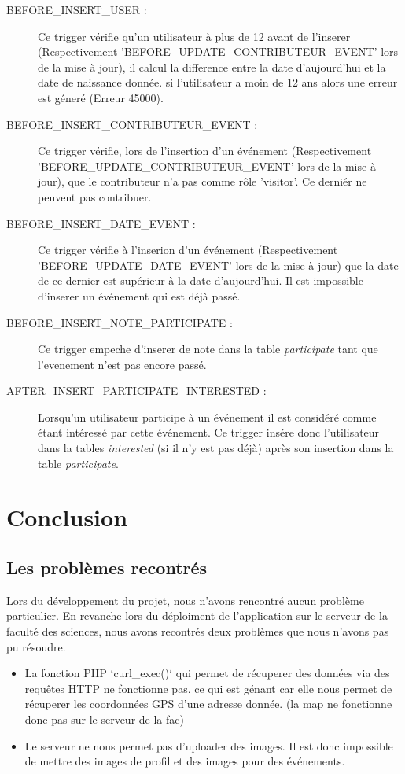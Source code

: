 \documentclass[oneside,11pt,a4paper]{article}
\begin{document}
\begin{description}
	\item[BEFORE\_INSERT\_USER : ] Ce trigger vérifie qu'un utilisateur à plus de 12 avant de l'inserer (Respectivement 'BEFORE\_UPDATE\_CONTRIBUTEUR\_EVENT' lors de la mise à jour), il calcul la difference entre la date d'aujourd'hui et la date de naissance donnée. si l'utilisateur a moin de 12 ans alors une erreur est géneré (Erreur 45000).
	\item[BEFORE\_INSERT\_CONTRIBUTEUR\_EVENT : ] Ce trigger vérifie, lors de l'insertion d'un événement (Respectivement 'BEFORE\_UPDATE\_CONTRIBUTEUR\_EVENT' lors de la mise à jour), que le contributeur n'a pas comme rôle 'visitor'. Ce derniér ne peuvent pas contribuer.
	\item[BEFORE\_INSERT\_DATE\_EVENT : ] Ce trigger vérifie à l'inserion d'un événement (Respectivement 'BEFORE\_UPDATE\_DATE\_EVENT' lors de la mise à jour) que la date de ce dernier est supérieur à la date d'aujourd'hui. Il est impossible d'inserer un événement qui est déjà passé.
	\item[BEFORE\_INSERT\_NOTE\_PARTICIPATE : ] Ce trigger empeche d'inserer de note dans la table \textit{participate} tant que l'evenement n'est pas encore passé.
	\item[AFTER\_INSERT\_PARTICIPATE\_INTERESTED : ] Lorsqu'un utilisateur participe à un événement il est considéré comme étant intéressé par cette événement. Ce trigger insére donc l'utilisateur dans la tables \textit{interested} (si il n'y est pas déjà) après son insertion dans la table \textit{participate}.
\end{description}

\section{Conclusion}

\subsection{Les problèmes recontrés}

Lors du développement du projet, nous n'avons rencontré aucun problème particulier. En revanche lors du déploiment de l'application sur le serveur de la faculté des sciences, nous avons recontrés deux problèmes que nous n'avons pas pu résoudre.

\begin{itemize}
	\item La fonction PHP `curl\_exec()` qui permet de récuperer des données via des requêtes HTTP ne fonctionne pas. ce qui est génant car elle nous permet de récuperer les coordonnées GPS d'une adresse donnée. (la map ne fonctionne donc pas sur le serveur de la fac)
	\item Le serveur ne nous permet pas d'uploader des images. Il est donc impossible de mettre des images de profil et des images pour des événements.
\end{itemize}
\end{document}
